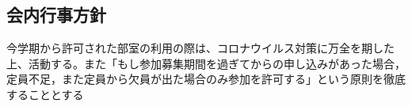 \subsection*{会内行事方針}

今学期から許可された部室の利用の際は、コロナウイルス対策に万全を期した上、活動する。また「もし参加募集期間を過ぎてからの申し込みがあった場合，定員不足，また定員から欠員が出た場合のみ参加を許可する」という原則を徹底することとする